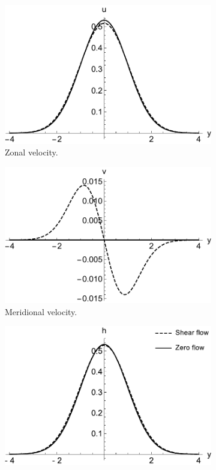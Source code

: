 \begin{figure}
  \begin{subfigure}[b]{0.33\textwidth}
    \includegraphics[width=\textwidth]{figures/wave-mean-flow/free-u-shear-kelvin.pdf}
    \caption{Zonal velocity.}
    \label{fig:free-u-shear-kelvin}
  \end{subfigure}
  \begin{subfigure}[b]{0.33\textwidth}
    \includegraphics[width=\textwidth]{figures/wave-mean-flow/free-v-shear-kelvin.pdf}
    \caption{Meridional velocity.}
    \label{fig:free-v-shear-kelvin}
  \end{subfigure}
  \begin{subfigure}[b]{0.33\textwidth}
    \includegraphics[width=\textwidth]{figures/wave-mean-flow/free-h-shear-kelvin.pdf}

\end{subfigure}
\end{figure}
